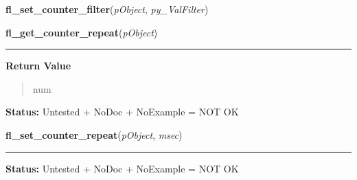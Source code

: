     \label{xformslib:library:fl_set_counter_filter}

    \vspace{0.5ex}

\hspace{.8\funcindent}\begin{boxedminipage}{\funcwidth}

    \raggedright \textbf{fl\_set\_counter\_filter}(\textit{pObject}, \textit{py\_ValFilter})

\setlength{\parskip}{2ex}
\setlength{\parskip}{1ex}
    \end{boxedminipage}

    \label{xformslib:library:fl_get_counter_repeat}

    \vspace{0.5ex}

\hspace{.8\funcindent}\begin{boxedminipage}{\funcwidth}

    \raggedright \textbf{fl\_get\_counter\_repeat}(\textit{pObject})

    \vspace{-1.5ex}

    \rule{\textwidth}{0.5\fboxrule}
\setlength{\parskip}{2ex}
\setlength{\parskip}{1ex}
      \textbf{Return Value}
    \vspace{-1ex}

      \begin{quote}
      num

      \end{quote}

\textbf{Status:} Untested + NoDoc + NoExample = NOT OK



    \end{boxedminipage}

    \label{xformslib:library:fl_set_counter_repeat}

    \vspace{0.5ex}

\hspace{.8\funcindent}\begin{boxedminipage}{\funcwidth}

    \raggedright \textbf{fl\_set\_counter\_repeat}(\textit{pObject}, \textit{msec})

    \vspace{-1.5ex}

    \rule{\textwidth}{0.5\fboxrule}
\setlength{\parskip}{2ex}
\setlength{\parskip}{1ex}
\textbf{Status:} Untested + NoDoc + NoExample = NOT OK



    \end{boxedminipage}


